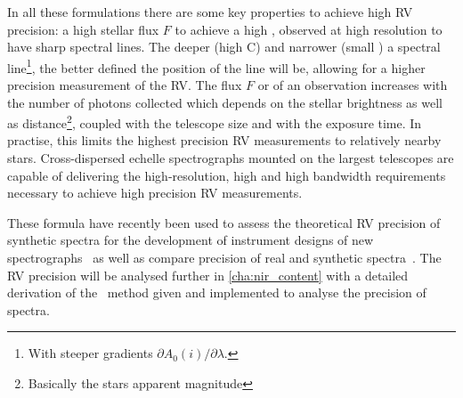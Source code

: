 In all these formulations there are some key properties to achieve high {RV} precision: a high stellar flux $F$ to achieve a high \snr{}, observed at high resolution to have sharp spectral lines.
The deeper (high C) and narrower (small \fwhm{}) a spectral line\footnote{With steeper gradients $\partial A_0(i)/\partial\lambda$.}, the better defined the position of the line will be, allowing for a higher precision measurement of the {RV}.
The flux $F$ or \snr{} of an observation increases with the number of photons collected which depends on the stellar brightness as well as distance\footnote{Basically the stars apparent magnitude}, coupled with the telescope size and with the exposure time.
In practise, this limits the highest precision {RV} measurements to relatively nearby stars.
Cross-dispersed echelle spectrographs mounted on the largest telescopes are capable of delivering the high-resolution, high \snr{} and high bandwidth requirements necessary to achieve high precision {RV} measurements.

These formula have recently been used to assess the theoretical {RV} precision of synthetic spectra for the development of instrument designs of new \nir{} spectrographs~\citep[e.g.][]{figueira_radial_2016} as well as compare precision of real and synthetic spectra~\citep[e.g.][]{artigau_optical_2018}.
The {RV} precision will be analysed further in \cref{cha:nir_content} with a detailed derivation of the~\citet{bouchy_fundamental_2001} method given and implemented to analyse the precision of \nir{} spectra.
